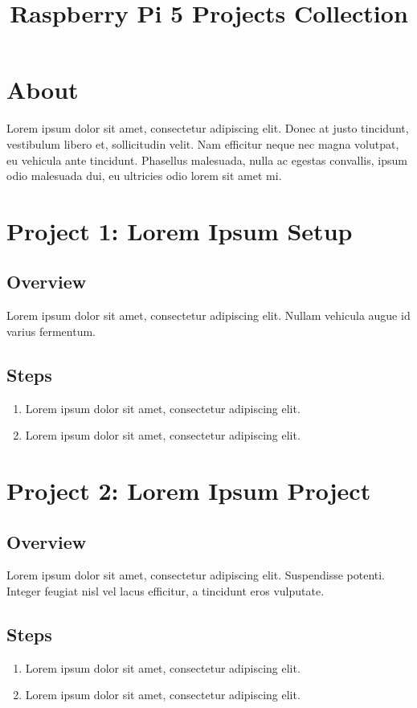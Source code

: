 \documentclass[a4paper,12pt]{article}
\title{Raspberry Pi 5 Projects Collection}
\date{} %
\begin{document}
\maketitle

\renewcommand{\cftsecleader}{\cftdotfill{\cftdotsep}} %

\tableofcontents

\section*{About}
Lorem ipsum dolor sit amet, consectetur adipiscing elit. Donec at justo tincidunt, vestibulum libero et, sollicitudin velit. Nam efficitur neque nec magna volutpat, eu vehicula ante tincidunt. Phasellus malesuada, nulla ac egestas convallis, ipsum odio malesuada dui, eu ultricies odio lorem sit amet mi.

\section{Project 1: Lorem Ipsum Setup}

\subsection{Overview}
Lorem ipsum dolor sit amet, consectetur adipiscing elit. Nullam vehicula augue id varius fermentum.

\subsection{Steps}
\begin{enumerate}
    \item Lorem ipsum dolor sit amet, consectetur adipiscing elit.
    \item Lorem ipsum dolor sit amet, consectetur adipiscing elit.
\end{enumerate}

\section{Project 2: Lorem Ipsum Project}

\subsection{Overview}
Lorem ipsum dolor sit amet, consectetur adipiscing elit. Suspendisse potenti. Integer feugiat nisl vel lacus efficitur, a tincidunt eros vulputate.

\subsection{Steps}
\begin{enumerate}
    \item Lorem ipsum dolor sit amet, consectetur adipiscing elit.
    \item Lorem ipsum dolor sit amet, consectetur adipiscing elit.
\end{enumerate}
\end{document}
